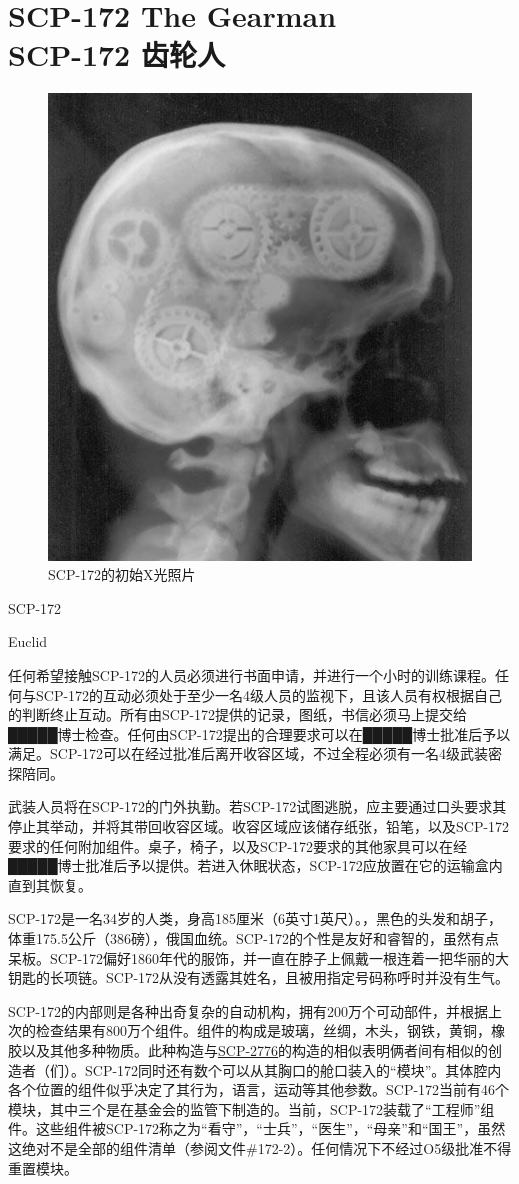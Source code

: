 \chapter[SCP-172 齿轮人]{
    SCP-172 The Gearman\\
    SCP-172 齿轮人
}

\label{chap:SCP-172}

\begin{figure}[H]
    \centering
    \includegraphics[width=0.5\linewidth]{images/SCP-172.jpg}
    \caption*{SCP-172的初始X光照片}
\end{figure}

SCP-172

Euclid

任何希望接触SCP-172的人员必须进行书面申请，并进行一个小时的训练课程。任何与SCP-172的互动必须处于至少一名4级人员的监视下，且该人员有权根据自己的判断终止互动。所有由SCP-172提供的记录，图纸，书信必须马上提交给█████博士检查。任何由SCP-172提出的合理要求可以在█████博士批准后予以满足。SCP-172可以在经过批准后离开收容区域，不过全程必须有一名4级武装密探陪同。

武装人员将在SCP-172的门外执勤。若SCP-172试图逃脱，应主要通过口头要求其停止其举动，并将其带回收容区域。收容区域应该储存纸张，铅笔，以及SCP-172要求的任何附加组件。桌子，椅子，以及SCP-172要求的其他家具可以在经█████博士批准后予以提供。若进入休眠状态，SCP-172应放置在它的运输盒内直到其恢复。

SCP-172是一名34岁的人类，身高185厘米（6英寸1英尺）。，黑色的头发和胡子，体重175.5公斤（386磅），俄国血统。SCP-172的个性是友好和睿智的，虽然有点呆板。SCP-172偏好1860年代的服饰，并一直在脖子上佩戴一根连着一把华丽的大钥匙的长项链。SCP-172从没有透露其姓名，且被用指定号码称呼时并没有生气。

SCP-172的内部则是各种出奇复杂的自动机构，拥有200万个可动部件，并根据上次的检查结果有800万个组件。组件的构成是玻璃，丝绸，木头，钢铁，黄铜，橡胶以及其他多种物质。此种构造与\hyperref[chap:SCP-2776]{SCP-2776}的构造的相似表明俩者间有相似的创造者（们）。SCP-172同时还有数个可以从其胸口的舱口装入的“模块”。其体腔内各个位置的组件似乎决定了其行为，语言，运动等其他参数。SCP-172当前有46个模块，其中三个是在基金会的监管下制造的。当前，SCP-172装载了“工程师”组件。这些组件被SCP-172称之为“看守”，“士兵”，“医生”，“母亲”和“国王”，虽然这绝对不是全部的组件清单（参阅文件\#172-2）。任何情况下不经过O5级批准不得重置模块。

